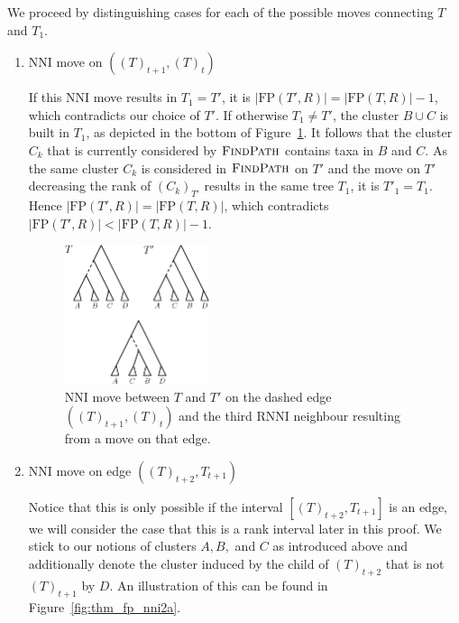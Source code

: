 \documentclass{amsart}
\newcommand{\rnni}{\mathrm{RNNI}}
\newcommand{\findpath}{\textsc{FindPath}}
\newcommand{\nni}{\mathrm{NNI}}
\newcommand{\fp}{\mathrm{FP}}
\begin{document}
We proceed by distinguishing cases for each of the possible moves connecting $T$ and $T_1$.

\begin{enumerate}[label = 1.{\arabic*}]
\item $\nni$ move on $((T)_{t+1},(T)_t)$

If this $\nni$ move results in $T_1 = T'$, it is $|\fp(T',R)| = |\fp(T,R)| - 1$, which contradicts our choice of $T'$.
If otherwise $T_1 \neq T'$, the cluster $B \cup C$ is built in $T_1$, as depicted in the bottom of Figure~\ref{fig:thm_fp_nni1}.
It follows that the cluster $C_k$ that is currently considered by $\findpath$ contains taxa in $B$ and $C$.
As the same cluster $C_k$ is considered in $\findpath$ on $T'$
 and the move on $T'$ decreasing the rank of $(C_k)_{T'}$ results in the same tree $T_1$, it is $T'_1 = T_1$.
Hence $|\fp(T',R)| = |\fp(T,R)|$, which contradicts $|\fp(T',R)| < |\fp(T,R)| - 1$.

\begin{figure}[!hbt]
\centering
\includegraphics[width=0.4\textwidth]{thm_fp_nni1}
\vspace{12pt}
\caption{$\nni$ move between $T$ and $T'$ on the dashed edge $((T)_{t+1},(T)_t)$ and the third $\rnni$ neighbour resulting from a move on that edge.}
\label{fig:thm_fp_nni1}
\end{figure}

\item $\nni$ move on edge $((T)_{t+2},T_{t+1})$

Notice that this is only possible if the interval $[(T)_{t+2},T_{t+1}]$ is an edge, we will consider the case that this is a rank interval later in this proof.
We stick to our notions of clusters $A,B,$ and $C$ as introduced above and additionally denote the cluster induced by the child of $(T)_{t+2}$ that is not $(T)_{t+1}$ by $D$.
An illustration of this can be found in Figure~\ref{fig:thm_fp_nni2a}.


\end{enumerate}
\end{document}
